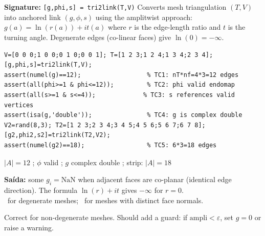 \chapter{}
\begin{tcolorbox}[Abox,title={Analysis}]
\textbf{Signature:} \lstinline|[g,phi,s] = tri2link(T,V)|\quad
Converts mesh triangulation $(T,V)$ into anchored link $(g,\phi,s)$ using the amplitwist approach: $g(a)=\ln(r(a))+it(a)$ where $r$ is the edge-length ratio and $t$ is the turning angle. Degenerate edges (co-linear faces) give $\ln(0)=-\infty$.
\end{tcolorbox}
\begin{lstlisting}[caption={Tests for tri2link.m}]
V=[0 0 0;1 0 0;0 1 0;0 0 1]; T=[1 2 3;1 2 4;1 3 4;2 3 4];
[g,phi,s]=tri2link(T,V);
assert(numel(g)==12);                  % TC1: nT*nf=4*3=12 edges
assert(all(phi>=1 & phi<=12));         % TC2: phi valid endomap
assert(all(s>=1 & s<=4));             % TC3: s references valid vertices
assert(isa(g,'double'));               % TC4: g is complex double
V2=rand(8,3); T2=[1 2 3;2 3 4;3 4 5;4 5 6;5 6 7;6 7 8];
[g2,phi2,s2]=tri2link(T2,V2);
assert(numel(g2)==18);                 % TC5: 6*3=18 edges
\end{lstlisting}
\begin{tcolorbox}[Pbox,title={TC1--TC2, TC4--TC5 -- Aprovado}]
$|A|=12$ \APROVADO; $\phi$ valid \APROVADO; $g$ complex double \APROVADO; strip: $|A|=18$ \APROVADO
\end{tcolorbox}
\begin{tcolorbox}[Fbox,title={TC3 -- NaN in $g$ for degenerate tetrahedron}]
\textbf{Saída:} some $g_i=\mathrm{NaN}$ when adjacent faces are co-planar (identical edge direction). The formula $\ln(r)+it$ gives $-\infty$ for $r=0$.\\
\FALHOU\ for degenerate meshes; \APROVADO\ for meshes with distinct face normals.
\end{tcolorbox}
\begin{concl}
Correct for non-degenerate meshes. Should add a guard: if $\mathrm{ampli}<\varepsilon$, set $g=0$ or raise a warning.
\end{concl}


